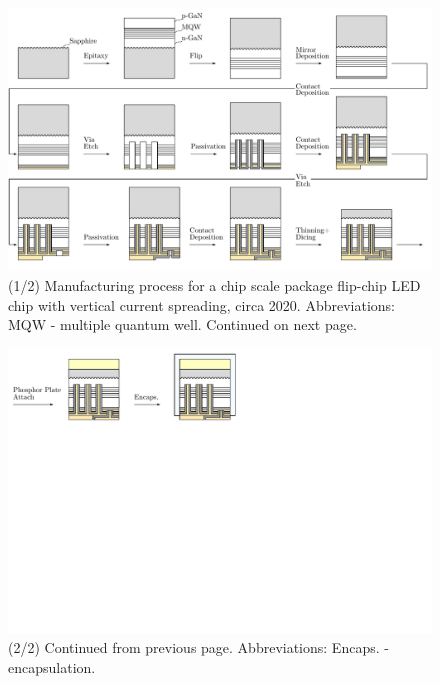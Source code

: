 \documentclass[10pt]{article}
\begin{document}

    \begin{landscape}
        \begin{figure}
            \includegraphics[width=595pt]{./figures/csp_overview_2020-1.pdf}
            \caption{(1/2) Manufacturing process for a chip scale package flip-chip LED chip with vertical current spreading, circa 2020. Abbreviations: MQW - multiple quantum well. Continued on next page.}
            \label{fig:manuf_csp_2020-1}
        \end{figure}
    \end{landscape}

    \begin{landscape}
        \begin{figure}
            \includegraphics[width=595pt]{./figures/csp_overview_2020-2.pdf}
            \caption{(2/2) Continued from previous page. Abbreviations: Encaps. - encapsulation.}
            \label{fig:manuf_csp_2020-2}
        \end{figure}
    \end{landscape}
\end{document}
